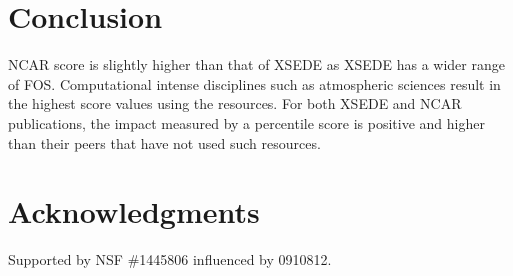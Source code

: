 \documentclass[10pt, conference, compsocconf]{IEEEtran}
\begin{document}
\section{Conclusion} \label{S:conclusion}

NCAR score is slightly higher than that of XSEDE as XSEDE has a wider range of FOS. Computational intense disciplines such as atmospheric sciences result in the highest score values using the resources. For both XSEDE and NCAR publications, the impact measured by a percentile score is positive and higher than their peers that have not used such resources.


\section*{Acknowledgments}

Supported by NSF \#1445806 influenced by 0910812.
 

%
% 

 
\end{document}
